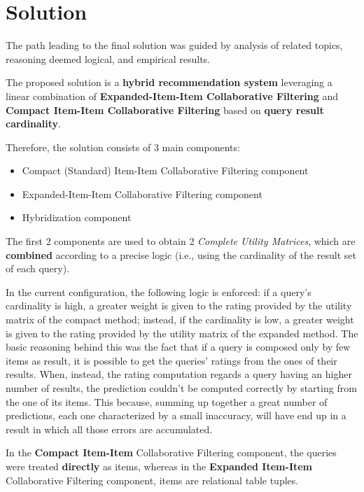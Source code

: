 \section{Solution}
\label{sec:solution}

The path leading to the final solution was guided by analysis of related topics, reasoning deemed logical, and empirical results.

The proposed solution is a \textbf{hybrid recommendation system} leveraging a linear combination of \textbf{Expanded-Item-Item Collaborative Filtering} and \textbf{Compact Item-Item Collaborative Filtering} based on \textbf{query result cardinality}.


Therefore, the solution consists of 3 main components:
\begin{itemize}
    \item Compact (Standard) Item-Item Collaborative Filtering component
    \item Expanded-Item-Item Collaborative Filtering component
    \item Hybridization component
\end{itemize}


The first 2 components are used to obtain 2 \textit{Complete Utility Matrices}, which are \textbf{combined} according to a precise logic (i.e., using the cardinality of the result set of each query).

In the current configuration, the following logic is enforced: if a query's cardinality is high, a greater weight is given to the rating provided by the utility matrix of the compact method; instead, if the cardinality is low, a greater weight is given to the rating provided by the utility matrix of the expanded method.
The basic reasoning behind this was the fact that if a query is composed only by few items as result, it is possible to get the queries' ratings from the ones of their results. When, instead, the rating computation regards a query having an higher number of results, the prediction couldn't be computed correctly by starting from the one of its items. This because, summing up together a great number of predictions, each one characterized by a small inaccuracy, will have end up in a result in which all those errors are accumulated. 


In the \textbf{Compact Item-Item} Collaborative Filtering component, the queries were treated \textbf{directly} as items, whereas in the \textbf{Expanded Item-Item} Collaborative Filtering component, items are relational table tuples.


